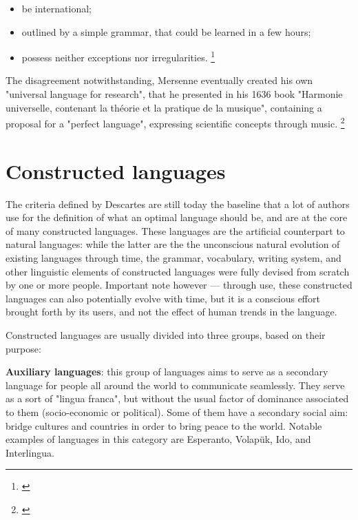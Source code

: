 \begin{itemize}
    \setlength\itemsep{-0.5em}
    \item be international;
    \item outlined by a simple grammar, that could be learned in a few hours;
    \item possess neither exceptions nor irregularities. \footnote{\cite[76-82]{descartes1897oeuvres}}
\end{itemize}

The disagreement notwithstanding, Mersenne eventually created his own "universal language for research", that he presented in his 1636 book
"Harmonie universelle, contenant la th{\'e}orie et la pratique de la musique", containing a proposal for a "perfect language", expressing scientific
concepts through music. \footnote{\cite[Book I, proposition 24]{mersenne1636}}

\section{Constructed languages}

The criteria defined by Descartes are still today the baseline that a lot of authors use for the definition of what an optimal language should be, and are at the core of many
constructed languages. These languages are the artificial counterpart to natural languages: while the latter are the the unconscious natural evolution of existing languages through
time, the grammar, vocabulary, writing system, and other linguistic elements of constructed languages were fully devised from scratch by one or more people. Important note
however --- through use, these constructed languages can also potentially evolve with time, but it is a conscious effort brought forth by its users, and not the effect of human
trends in the language.\newline

Constructed languages are usually divided into three groups, based on their purpose:\newline

\newpage
\textbf{Auxiliary languages}: this group of languages aims to serve as a secondary language for people all around the world to communicate seamlessly.
They serve as a sort of "lingua franca", but without the usual factor of dominance associated to them (socio-economic or political). Some of them have a secondary social aim:
bridge cultures and countries in order to bring peace to the world. Notable examples of languages in this category are Esperanto, Volapük, Ido, and Interlingua.\newline

